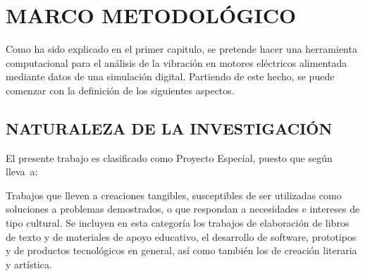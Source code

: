 \thispagestyle{empty}

\section{MARCO METODOLÓGICO}

Como ha sido explicado en el primer capitulo, se pretende hacer una herramienta
computacional para el análisis de la vibración en motores eléctricos alimentada
mediante datos de una simulación digital. Partiendo de este hecho, se puede
comenzar con la definición de los siguientes aspectos.

\subsection{NATURALEZA DE LA INVESTIGACIÓN}

El presente trabajo es clasificado como Proyecto Especial, puesto que según
\textcite{Hernandez} lleva~a:

\begin{center}
    \parbox[ht]{13.5 cm}{Trabajos que lleven a creaciones tangibles,
    susceptibles de ser utilizadas como soluciones a problemas demostrados, o
    que respondan a necesidades e intereses de tipo cultural. Se incluyen en
    esta categoría los trabajos de elaboración de libros de texto y de
    materiales de apoyo educativo, el desarrollo de software, prototipos y de
    productos tecnológicos en general, así como también los de creación
    literaria y artística.}
\end{center}
